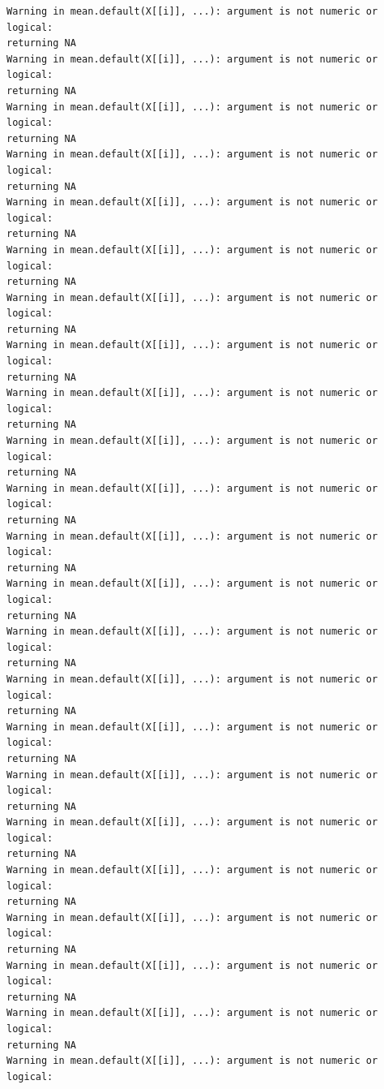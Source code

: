 \documentclass[
  letterpaper,
  DIV=11,
  numbers=noendperiod]{scrartcl}
\newenvironment{Shaded}{\begin{snugshade}}{\end{snugshade}}
\newcommand{\AttributeTok}[1]{\textcolor[rgb]{0.40,0.45,0.13}{#1}}
\newcommand{\CommentTok}[1]{\textcolor[rgb]{0.37,0.37,0.37}{#1}}
\newcommand{\FunctionTok}[1]{\textcolor[rgb]{0.28,0.35,0.67}{#1}}
\newcommand{\NormalTok}[1]{\textcolor[rgb]{0.00,0.23,0.31}{#1}}
\newcommand{\OtherTok}[1]{\textcolor[rgb]{0.00,0.23,0.31}{#1}}
\newcommand{\SpecialCharTok}[1]{\textcolor[rgb]{0.37,0.37,0.37}{#1}}
\begin{document}
\begin{Shaded}
\end{Shaded}

\begin{verbatim}
Warning in mean.default(X[[i]], ...): argument is not numeric or logical:
returning NA
Warning in mean.default(X[[i]], ...): argument is not numeric or logical:
returning NA
Warning in mean.default(X[[i]], ...): argument is not numeric or logical:
returning NA
Warning in mean.default(X[[i]], ...): argument is not numeric or logical:
returning NA
Warning in mean.default(X[[i]], ...): argument is not numeric or logical:
returning NA
Warning in mean.default(X[[i]], ...): argument is not numeric or logical:
returning NA
Warning in mean.default(X[[i]], ...): argument is not numeric or logical:
returning NA
Warning in mean.default(X[[i]], ...): argument is not numeric or logical:
returning NA
Warning in mean.default(X[[i]], ...): argument is not numeric or logical:
returning NA
Warning in mean.default(X[[i]], ...): argument is not numeric or logical:
returning NA
Warning in mean.default(X[[i]], ...): argument is not numeric or logical:
returning NA
Warning in mean.default(X[[i]], ...): argument is not numeric or logical:
returning NA
Warning in mean.default(X[[i]], ...): argument is not numeric or logical:
returning NA
Warning in mean.default(X[[i]], ...): argument is not numeric or logical:
returning NA
Warning in mean.default(X[[i]], ...): argument is not numeric or logical:
returning NA
Warning in mean.default(X[[i]], ...): argument is not numeric or logical:
returning NA
Warning in mean.default(X[[i]], ...): argument is not numeric or logical:
returning NA
Warning in mean.default(X[[i]], ...): argument is not numeric or logical:
returning NA
Warning in mean.default(X[[i]], ...): argument is not numeric or logical:
returning NA
Warning in mean.default(X[[i]], ...): argument is not numeric or logical:
returning NA
Warning in mean.default(X[[i]], ...): argument is not numeric or logical:
returning NA
Warning in mean.default(X[[i]], ...): argument is not numeric or logical:
returning NA
Warning in mean.default(X[[i]], ...): argument is not numeric or logical:

\end{verbatim}
\end{document}

